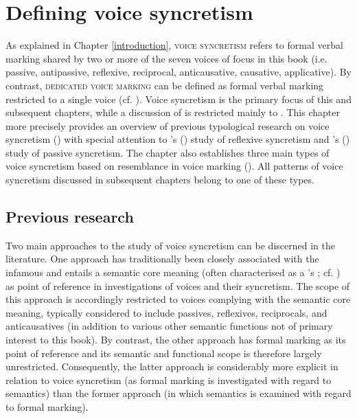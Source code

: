 \chapter{Defining voice syncretism} \label{voice-syncretism}
As explained in Chapter \ref{introduction}, \textsc{voice syncretism} refers to formal verbal marking shared by two or more of the seven voices of focus in this book (i.e. passive, antipassive, reflexive, reciprocal, anticausative, causative, applicative). By contrast, \textsc{dedicated voice marking} can be defined as formal verbal marking restricted to a single voice (cf. \citealt[233]{zuniga:kittila:2019}). Voice syncretism is the primary focus of this and subsequent chapters, while a discussion of  is restricted mainly to . This chapter more precisely provides an overview of previous typological research on voice syncretism () with special attention to \citeauthor{geniusiene:1987}’s (\citeyear{geniusiene:1987}) study of reflexive syncretism and \citeauthor{haspelmath:1990}’s (\citeyear{haspelmath:1990}) study of passive syncretism. The chapter also establishes three main types of voice syncretism based on resemblance in voice marking (). All patterns of voice syncretism discussed in subsequent chapters belong to one of these types.

\section{Previous research} \label{previous-research}
Two main approaches to the study of voice syncretism can be discerned in the literature. One approach has traditionally been closely associated with the infamous  and entails a semantic core meaning (often characterised as a ’s ; cf. \citealt{klaiman:1991}) as point of reference in investigations of voices and their syncretism. The scope of this approach is accordingly restricted to voices complying with the semantic core meaning, typically considered to include passives, reflexives, reciprocals, and anticausatives (in addition to various other semantic functions not of primary interest to this book). By contrast, the other approach has formal marking as its point of reference and its semantic and functional scope is therefore largely unrestricted. Consequently, the latter approach is considerably more explicit in relation to voice syncretism (as formal marking is investigated with regard to semantics) than the former approach (in which semantics is examined with regard to formal marking).

